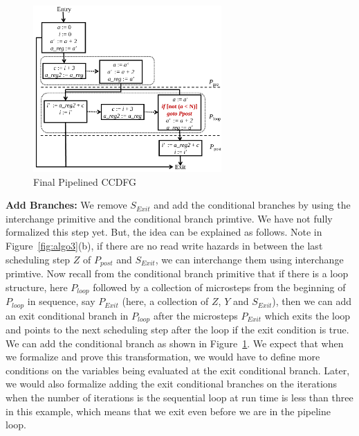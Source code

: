 \begin{figure}[t!]
\begin{center}
\includegraphics[height=2.5in]{fig-proposal/algorithm-after-adding-branches}
\end{center}
\caption{Final Pipelined CCDFG}
\label{fig:algo4}
\end{figure}

{\bf Add Branches:}  We remove $S_{Exit}$ and add the conditional branches by using the interchange primitive and the conditional branch primtive. We have not fully formalized this step yet. 
But, the idea can be explained as follows. Note in Figure~\ref{fig:algo3}(b), if there are no read write hazards in between the last scheduling step $Z$ of $P_{post}$ and $S_{Exit}$, we can interchange them using interchange primtive.
Now recall from the conditional branch primitive that if there is a loop structure, here $P_{loop}$ followed by 
a collection of microsteps from the beginning of $P_{loop}$ in sequence, say $P_{Exit}$ (here, a collection of $Z$, $Y$ and $S_{Exit}$),
then we can add an exit conditional branch in $P_{loop}$ after the microsteps $P_{Exit}$ which exits the loop and points to
the next scheduling step after the loop if the exit condition is true. We can add the conditional branch as shown in  Figure~\ref{fig:algo4}. We expect that when we formalize and prove this 
transformation, we would have to define more conditions on the variables being evaluated at the exit conditional branch. 
Later, we would also formalize adding the exit conditional branches on the iterations when the number of iterations is the sequential loop at run time is less than three in this example, which means that we exit even before we are in the pipeline loop. 

